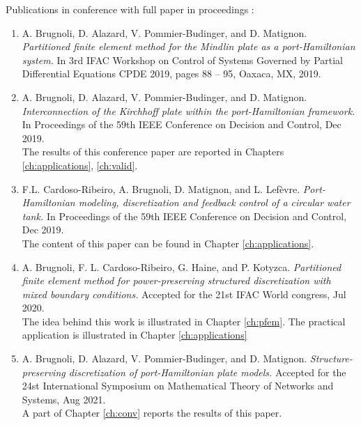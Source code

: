 Publications in conference with full paper in proceedings \cite{brugnoli2019cpde,brugnoli2019cdc,cardoso2019cdc,brugnoli2020wc,brugnoli2020mtns}:
\begin{enumerate}
	\item A. Brugnoli, D. Alazard, V. Pommier-Budinger, and D. Matignon. \textit{Partitioned finite element method for the Mindlin plate as a port-Hamiltonian system.} In 3rd IFAC Workshop on Control of Systems Governed by Partial Differential Equations CPDE 2019, pages 88 – 95, Oaxaca, MX, 2019. 
	\item A. Brugnoli, D. Alazard, V. Pommier-Budinger, and D. Matignon. \textit{Interconnection of the Kirchhoff plate within the port-Hamiltonian framework.} In Proceedings of the 59th IEEE Conference on Decision and Control, Dec 2019. \\
	The results of this conference paper are reported in Chapters \ref{ch:applications}, \ref{ch:valid}.
	\item F.L. Cardoso-Ribeiro, A. Brugnoli, D. Matignon, and L. Lefèvre. \textit{Port-Hamiltonian modeling, discretization and feedback control of a circular water tank.} In Proceedings of the 59th IEEE Conference on Decision and Control, Dec 2019. \\
	The content of this paper can be found in Chapter \ref{ch:applications}.
	\item A. Brugnoli, F. L. Cardoso-Ribeiro, G. Haine, and P. Kotyzca. \textit{Partitioned finite element method for power-preserving structured discretization with mixed boundary conditions.} Accepted for the 21st IFAC World congress, Jul 2020. \\
	The idea behind this work is illustrated in Chapter \ref{ch:pfem}. The practical application is illustrated in Chapter \ref{ch:applications}
	\item A. Brugnoli, D. Alazard, V. Pommier-Budinger, and D. Matignon. \textit{Structure-preserving discretization of port-Hamiltonian plate models.} Accepted for the 24st International Symposium on Mathematical Theory of Networks and Systems, Aug 2021. \\
	A part of Chapter \ref{ch:conv} reports the results of this paper.
\end{enumerate}




